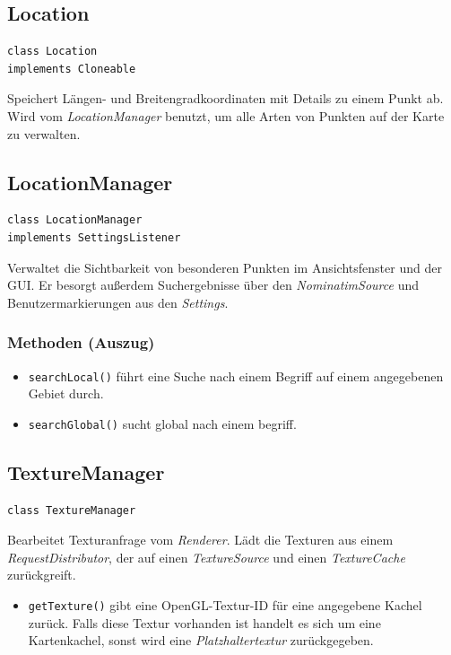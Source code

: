 \documentclass[10pt]{scrreprt}
\begin{document}
\vspace{5mm}
\subsection*{Location}
\begin{lstlisting}
class Location
implements Cloneable
\end{lstlisting}
Speichert Längen- und Breitengradkoordinaten mit Details zu einem Punkt ab. Wird vom \textit{LocationManager} benutzt, um alle Arten von Punkten auf der Karte zu verwalten.\\

\vspace{5mm}
\subsection*{LocationManager}
\begin{lstlisting}
class LocationManager
implements SettingsListener
\end{lstlisting}
Verwaltet die Sichtbarkeit von besonderen Punkten im Ansichtsfenster und der GUI. Er besorgt außerdem Suchergebnisse über den \textit{NominatimSource} und Benutzermarkierungen aus den \textit{Settings}.\\
\subsubsection*{Methoden (Auszug)}
\begin{itemize}
\item \texttt{searchLocal()} führt eine Suche nach einem Begriff auf einem angegebenen Gebiet durch.
\item \texttt{searchGlobal()} sucht global nach einem begriff.
\end{itemize}

\vspace{5mm}
\subsection*{TextureManager}
\begin{lstlisting}
class TextureManager
\end{lstlisting}
Bearbeitet Texturanfrage vom \textit{Renderer}. Lädt die Texturen aus einem \textit{RequestDistributor}, der auf einen \textit{TextureSource} und einen \textit{TextureCache} zurückgreift.\\
\begin{itemize}
\item\texttt{getTexture()} gibt eine OpenGL-Textur-ID für eine angegebene Kachel zurück. Falls diese Textur vorhanden ist handelt es sich um eine Kartenkachel, sonst wird eine \textit{Platzhaltertextur} zurückgegeben.
\end{itemize}
\end{document}
